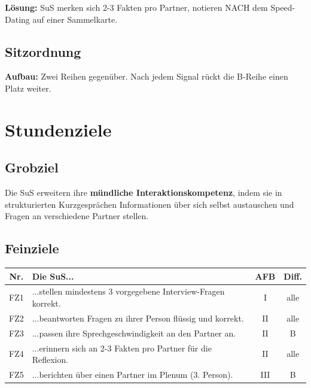 \documentclass[11pt, a4paper]{article}
\begin{document}
\textbf{Lösung:} SuS merken sich 2-3 Fakten pro Partner, notieren NACH dem Speed-Dating auf einer Sammelkarte.

\subsection{Sitzordnung}

\begin{center}
\end{center}

\textbf{Aufbau:} Zwei Reihen gegenüber. Nach jedem Signal rückt die B-Reihe einen Platz weiter.


\section{Stundenziele}

\subsection{Grobziel}

Die SuS erweitern ihre \textbf{mündliche Interaktionskompetenz}, indem sie in strukturierten Kurzgesprächen Informationen über sich selbst austauschen und Fragen an verschiedene Partner stellen.

\subsection{Feinziele}

\begin{center}
\begin{tabularx}{\textwidth}{|c|X|c|c|}
    \hline
    \textbf{Nr.} & \textbf{Die SuS...} & \textbf{AFB} & \textbf{Diff.} \\
    \hline
    FZ1 & ...stellen mindestens 3 vorgegebene Interview-Fragen korrekt. & I & alle \\
    \hline
    FZ2 & ...beantworten Fragen zu ihrer Person flüssig und korrekt. & II & alle \\
    \hline
    FZ3 & ...passen ihre Sprechgeschwindigkeit an den Partner an. & II & B \\
    \hline
    FZ4 & ...erinnern sich an 2-3 Fakten pro Partner für die Reflexion. & II & alle \\
    \hline
    FZ5 & ...berichten über einen Partner im Plenum (3. Person). & III & B \\
    \hline
\end{tabularx}
\end{center}
\end{document}
